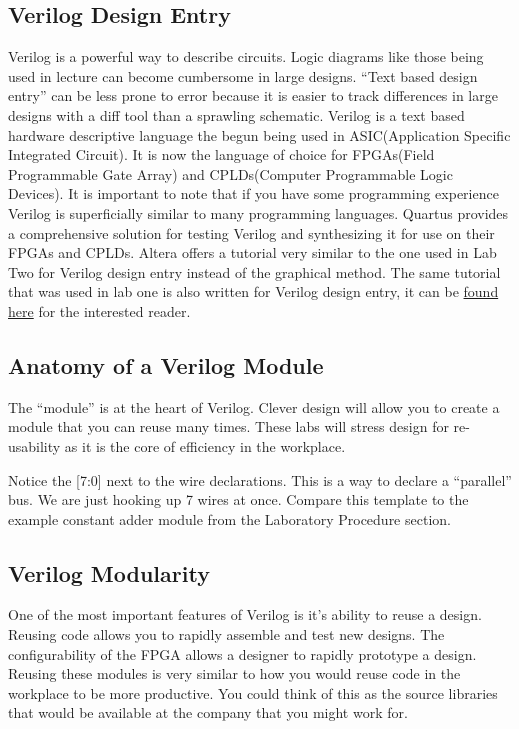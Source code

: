     \subsection{Verilog Design Entry}
      Verilog is a powerful way to describe circuits. Logic diagrams like those being used in lecture can become cumbersome in large designs. ``Text based design entry'' can be less prone to error because it is easier to track differences in large designs with a diff tool than a sprawling schematic. Verilog is a text based hardware descriptive language the begun being used in ASIC(Application Specific Integrated Circuit). It is now the language of choice for FPGAs(Field Programmable Gate Array) and CPLDs(Computer Programmable Logic Devices). It is important to note that if you have some programming experience Verilog is superficially similar to many programming languages. Quartus provides a comprehensive solution for testing Verilog and synthesizing it for use on their FPGAs and CPLDs. Altera offers a tutorial very similar to the one used in Lab Two for Verilog design entry instead of the graphical method. The same tutorial that was used in lab one is also written for Verilog design entry, it can be \href{ftp://ftp.altera.com/up/pub/Altera_Material/13.0/Tutorials/Verilog/Quartus_II_Introduction.pdf}{found here} for the interested reader.

    \subsection{Anatomy of a Verilog Module}
      The ``module'' is at the heart of Verilog. Clever design will allow you to create a module that you can reuse many times. These labs will stress design for re-usability as it is the core of efficiency in the workplace.
       

      Notice the [7:0] next to the wire declarations. This is a way to declare a ``parallel'' bus. We are just hooking up 7 wires at once. Compare this template to the example constant adder module from the Laboratory Procedure section.
      
      

    \subsection{Verilog Modularity}
      One of the most important features of Verilog is it's ability to reuse a design. Reusing code allows you to  rapidly assemble and test new designs. The configurability of the FPGA allows a designer to rapidly prototype a design. Reusing these modules is very similar to how you would reuse code in the workplace to be more productive. You could think of this as the source libraries that would be available at the company that you might work for.

